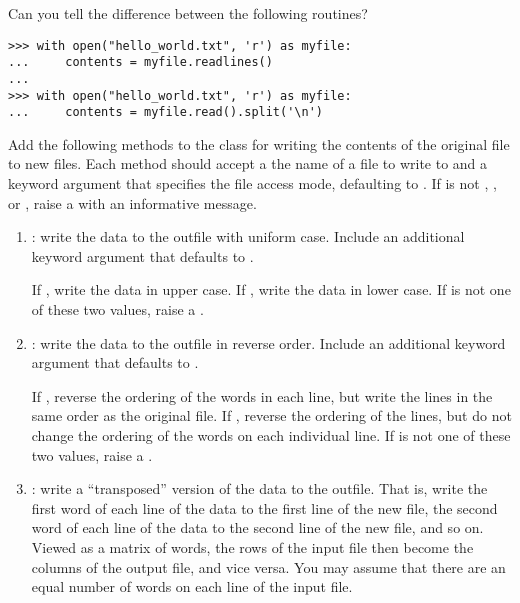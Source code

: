 Can you tell the difference between the following routines?

\begin{lstlisting}
>>> with open("hello_world.txt", 'r') as myfile:
...     contents = myfile.readlines()
...
>>> with open("hello_world.txt", 'r') as myfile:
...     contents = myfile.read().split('\n')
\end{lstlisting}

\begin{problem} %
Add the following methods to the  class for writing the contents of the original file to new files.
Each method should accept a the name of a file to write to and a keyword argument  that specifies the file access mode, defaulting to .
If  is not , , or , raise a  with an informative message.

\begin{enumerate}
\item {}: write the data to the outfile with uniform case. Include an additional keyword argument  that defaults to .

If , write the data in upper case.
If , write the data in lower case.
If  is not one of these two values, raise a .

\item {}: write the data to the outfile in reverse order. Include an additional keyword argument  that defaults to .

If , reverse the ordering of the words in each line, but write the lines in the same order as the original file.
If , reverse the ordering of the lines, but do not change the ordering of the words on each individual line.
If  is not one of these two values, raise a .

\item {}: write a ``transposed'' version of the data to the outfile.
That is, write the first word of each line of the data to the first line of the new file, the second word of each line of the data to the second line of the new file, and so on.
Viewed as a matrix of words, the rows of the input file then become the columns of the output file, and vice versa.
You may assume that there are an equal number of words on each line of the input file.
\end{enumerate}


\end{problem}
